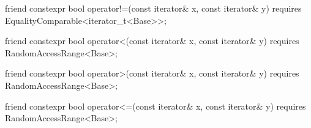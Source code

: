 {\begin{itemdescr}
\pnum
\oldtxt{\returns} 
\end{itemdescr}

%
\begin{itemdecl}
friend constexpr bool operator!=(const iterator& x, const iterator& y)
  requires EqualityComparable<iterator_t<Base>>;
\end{itemdecl}

\begin{itemdescr}
\pnum
\oldtxt{\returns} 
\end{itemdescr}

%
\begin{itemdecl}
friend constexpr bool operator<(const iterator& x, const iterator& y)
  requires RandomAccessRange<Base>;
\end{itemdecl}

\begin{itemdescr}
\pnum
\oldtxt{\returns} 
\end{itemdescr}

%
\begin{itemdecl}
friend constexpr bool operator>(const iterator& x, const iterator& y)
  requires RandomAccessRange<Base>;
\end{itemdecl}

\begin{itemdescr}
\pnum
\oldtxt{\returns} 
\end{itemdescr}

%
\begin{itemdecl}
friend constexpr bool operator<=(const iterator& x, const iterator& y)
  requires RandomAccessRange<Base>;
\end{itemdecl}

\begin{itemdescr}
\pnum
\oldtxt{\returns} 
\end{itemdescr}

}
